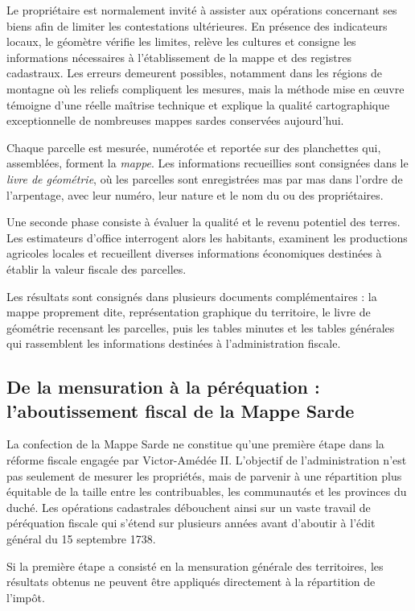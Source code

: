 \documentclass[12pt,a4paper]{report}
\begin{document}
Le propriétaire est normalement invité à assister aux opérations concernant ses biens afin de limiter les contestations ultérieures. En présence des indicateurs locaux, le géomètre vérifie les limites, relève les cultures et consigne les informations nécessaires à l'établissement de la mappe et des registres cadastraux. Les erreurs demeurent possibles, notamment dans les régions de montagne où les reliefs compliquent les mesures, mais la méthode mise en œuvre témoigne d'une réelle maîtrise technique et explique la qualité cartographique exceptionnelle de nombreuses mappes sardes conservées aujourd'hui.

Chaque parcelle est mesurée, numérotée et reportée sur des planchettes qui, assemblées, forment la \emph{mappe}. Les informations recueillies sont consignées dans le \emph{livre de géométrie}, où les parcelles sont enregistrées mas par mas dans l'ordre de l'arpentage, avec leur numéro, leur nature et le nom du ou des propriétaires.

Une seconde phase consiste à évaluer la qualité et le revenu potentiel des terres. Les estimateurs d'office interrogent alors les habitants, examinent les productions agricoles locales et recueillent diverses informations économiques destinées à établir la valeur fiscale des parcelles. 

Les résultats sont consignés dans plusieurs documents complémentaires : la mappe proprement dite, représentation graphique du territoire, le livre de géométrie recensant les parcelles, puis les tables minutes et les tables générales qui rassemblent les informations destinées à l'administration fiscale.



\subsection{De la mensuration à la péréquation : l'aboutissement fiscal de la Mappe Sarde}

La confection de la Mappe Sarde ne constitue qu'une première étape dans la réforme fiscale engagée par Victor-Amédée II. L'objectif de l'administration n'est pas seulement de mesurer les propriétés, mais de parvenir à une répartition plus équitable de la taille entre les contribuables, les communautés et les provinces du duché. Les opérations cadastrales débouchent ainsi sur un vaste travail de péréquation fiscale qui s'étend sur plusieurs années avant d'aboutir à l'édit général du 15 septembre 1738.

Si la première étape a consisté en la mensuration générale des territoires, les résultats obtenus ne peuvent être appliqués directement à la répartition de l'impôt.
\end{document}
